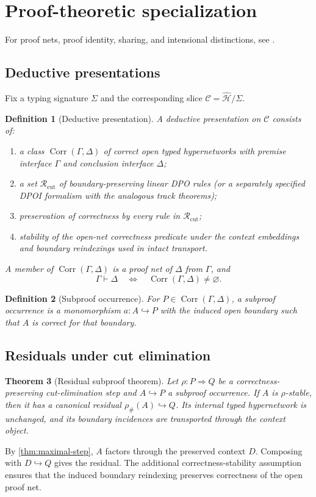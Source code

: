 \documentclass[12pt,a4paper,twoside]{extarticle}
\makeatletter
\theoremstyle{compactplain}
\newtheorem{theorem}{Theorem}[section]
\theoremstyle{compactdef}
\newtheorem{definition}[theorem]{Definition}
\renewenvironment{proof}[1][\proofname]{\par\pushQED{\qed}\normalfont
  \topsep2pt\trivlist\item[\hskip\labelsep\bfseries #1\@addpunct{.}]\ignorespaces}
 {\popQED\endtrivlist\@endpefalse}
\newcommand{\mono}{\hookrightarrow}
\makeatother
\begin{document}
\section{Proof-theoretic specialization}
For proof nets, proof identity, sharing, and intensional distinctions, see \cite{girard,strassburger,hasegawa,pfenning,hu-pientka}.

\subsection{Deductive presentations}
Fix a typing signature $\Sigma$ and the corresponding slice $\mathcal C=\widehat{\mathcal H}/\Sigma$.
\begin{definition}[Deductive presentation]
A deductive presentation on $\mathcal C$ consists of:
\begin{enumerate}
\item a class $\operatorname{Corr}(\Gamma,\Delta)$ of correct open typed hypernetworks with premise interface $\Gamma$ and conclusion interface $\Delta$;
\item a set $\mathcal R_{\mathrm{cut}}$ of boundary-preserving linear DPO rules (or a separately specified DPOI formalism with the analogous track theorems);
\item preservation of correctness by every rule in $\mathcal R_{\mathrm{cut}}$;
\item stability of the open-net correctness predicate under the context embeddings and boundary reindexings used in intact transport.
\end{enumerate}
A member of $\operatorname{Corr}(\Gamma,\Delta)$ is a proof net of $\Delta$ from $\Gamma$, and
\[
\Gamma\vdash\Delta\quad\Longleftrightarrow\quad\operatorname{Corr}(\Gamma,\Delta)\ne\varnothing.
\]
\end{definition}

\begin{definition}[Subproof occurrence]
For $P\in\operatorname{Corr}(\Gamma,\Delta)$, a subproof occurrence is a monomorphism $a:A\mono P$ with the induced open boundary such that $A$ is correct for that boundary.
\end{definition}

\subsection{Residuals under cut elimination}
\begin{theorem}[Residual subproof theorem]
Let $\rho:P\Rightarrow Q$ be a correctness-preserving cut-elimination step and $A\mono P$ a subproof occurrence. If $A$ is $\rho$-stable, then it has a canonical residual $\rho_{\#}(A)\mono Q$. Its internal typed hypernetwork is unchanged, and its boundary incidences are transported through the context object.
\end{theorem}
\begin{proof}
By \cref{thm:maximal-step}, $A$ factors through the preserved context $D$. Composing with $D\mono Q$ gives the residual. The additional correctness-stability assumption ensures that the induced boundary reindexing preserves correctness of the open proof net.
\end{proof}
\end{document}
